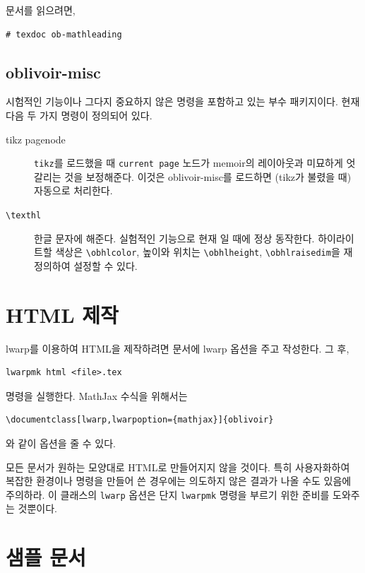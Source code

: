 \documentclass[
	12pt,
	a4paper,
	kosection,
	footnote,
	nobookmarks,
	microtype,
	figtabcapt,
]{oblivoir}
\def\cs#1{\texttt{\textbackslash #1}}
\begin{document}
\begin{boxedverbatim}
\usepackage{ob-mathleading}
\end{boxedverbatim}

문서를 읽으려면,
\begin{verbatim}
# texdoc ob-mathleading
\end{verbatim}

\subsection{oblivoir-misc}

시험적인 기능이나 그다지 중요하지 않은 명령을 포함하고 있는 
부수 패키지이다. 현재 다음 두 가지 명령이 정의되어 있다.

\begin{description}
\item[tikz pagenode] \texttt{tikz}를 로드했을 때 \texttt{current page}
노드가 memoir의 레이아웃과 미묘하게 엇갈리는 것을 보정해준다. 이것은 oblivoir-misc를 로드하면 (tikz가 불렸을 때) 자동으로 처리한다.
\item[\cs{texthl}] 한글 문자에 해준다. 실험적인 기능으로
현재 \XeLaTeX 일 때에 정상 동작한다. 하이라이트할 색상은 \cs{obhlcolor}, 높이와
위치는 \cs{obhlheight}, \cs{obhlraisedim}을 재정의하여 설정할 수 있다.
\end{description}


\section{HTML 제작}

\textsf{lwarp}를 이용하여 HTML을 제작하려면 문서에 \textsf{lwarp} 
옵션을 주고 작성한다. 그 후,
\begin{verbatim}
lwarpmk html <file>.tex
\end{verbatim}
명령을 실행한다. MathJax 수식을 위해서는 
\begin{verbatim}
\documentclass[lwarp,lwarpoption={mathjax}]{oblivoir}
\end{verbatim}
와 같이 옵션을 줄 수 있다.

모든 문서가 원하는 모양대로 HTML로 만들어지지 않을 것이다. 특히
사용자화하여 복잡한 환경이나 명령을 만들어 쓴 경우에는 의도하지 않은
결과가 나올 수도 있음에 주의하라. 이 클래스의 \verb|lwarp| 옵션은
단지 \verb|lwarpmk| 명령을 부르기 위한 준비를 도와주는 것뿐이다.

\section{샘플 문서}
\end{document}
